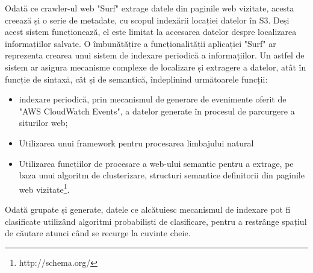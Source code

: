 Odată ce crawler-ul web "Surf" extrage datele din paginile web vizitate, acesta creează și o serie de metadate, cu scopul indexării locației datelor în S3. Deși acest sistem funcționează, el este limitat la accesarea datelor despre localizarea informațiilor salvate. O îmbunătățire a funcționalității aplicației "Surf" ar reprezenta crearea unui sistem de indexare periodică a informațiilor. Un astfel de sistem ar asigura mecanisme complexe de localizare și extragere a datelor, atât în funcție de sintaxă, cât și de semantică, îndeplinind următoarele funcții:

\begin{itemize}
	\item{indexare periodică, prin mecanismul de generare de evenimente oferit de "AWS CloudWatch Events", a datelor generate în procesul de parcurgere a siturilor web;}
	
	\item{Utilizarea unui framework pentru procesarea limbajului natural}
	
	\item{Utilizarea funcțiilor de procesare a web-ului semantic pentru a extrage, pe baza unui algoritm de clusterizare, structuri semantice definitorii din paginile web vizitate\footnote{http://schema.org/}.}	
	
\end{itemize}

\noindent
Odată grupate și generate, datele ce alcătuiesc mecanismul de indexare pot fi clasificate utilizând algoritmi probabiliști de clasificare, pentru a restrânge spațiul de căutare atunci când se recurge la cuvinte cheie.